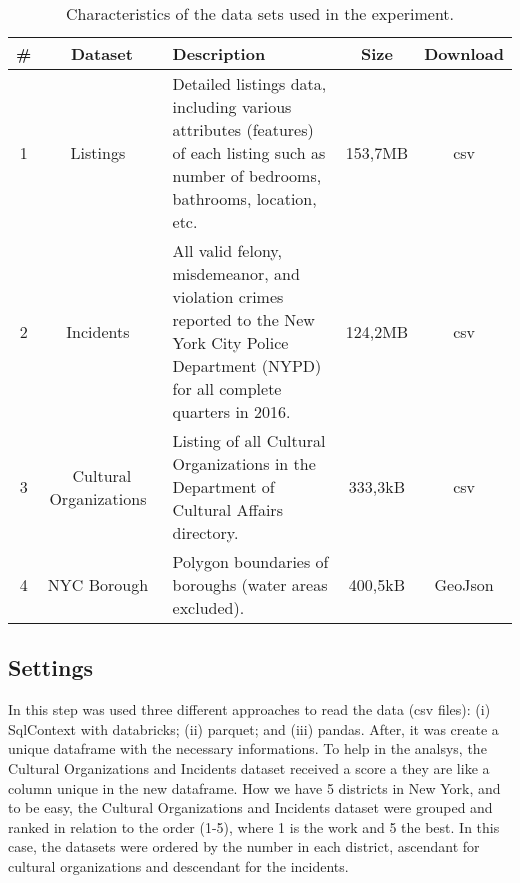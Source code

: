 \documentclass[sigconf]{acmart}
\begin{document}
\begin{table*}[!htpb]
	\fontsize{9pt}{9pt}\selectfont
	\centering
	\caption{Characteristics of the data sets used in the experiment.}
	\label{tab:datasets}
	\begin{tabular}{ccp{10cm}cc}
		\toprule
		\textbf{\#} &              \textbf{Dataset}               & \textbf{Description}                                                                                                                          & \textbf{Size} & \textbf{Download} \\ \midrule
		     1      &         Listings~\cite{base:airbnb}         & Detailed listings data, including various attributes (features) of each listing such as number of bedrooms, bathrooms, location, etc.         &    153,7MB    &        csv        \\ \midrule
		     2      &       Incidents~\cite{base:incidents}       & All valid felony, misdemeanor, and violation crimes reported to the New York City Police Department (NYPD) for all complete quarters in 2016. &    124,2MB    &        csv        \\ \midrule
		     3      & Cultural Organizations~\cite{base:cultural} & Listing of all Cultural Organizations in the Department of Cultural Affairs directory.                                                        &    333,3kB    &        csv        \\ \midrule
		     4      &       NYC Borough~\cite{base:borough}       & Polygon boundaries of boroughs (water areas excluded).                                                                                        &    400,5kB    &      GeoJson      \\ \bottomrule
	\end{tabular}
\end{table*}

\vspace{-0.2cm}
\subsection{Settings}

In this step was used three different approaches to read the data (csv files): (i) SqlContext with databricks; (ii) parquet; and (iii) pandas. After, it was create a unique dataframe with the necessary informations. To help in the analsys, the Cultural Organizations and Incidents dataset received a score a they are like a column unique in the new dataframe. How we have 5 districts in New York, and to be easy, the Cultural Organizations and Incidents dataset were grouped and ranked in relation to the order (1-5), where 1 is the work and 5 the best. In this case, the datasets were ordered by the number in each district, ascendant for cultural organizations and descendant for the incidents.
\end{document}
